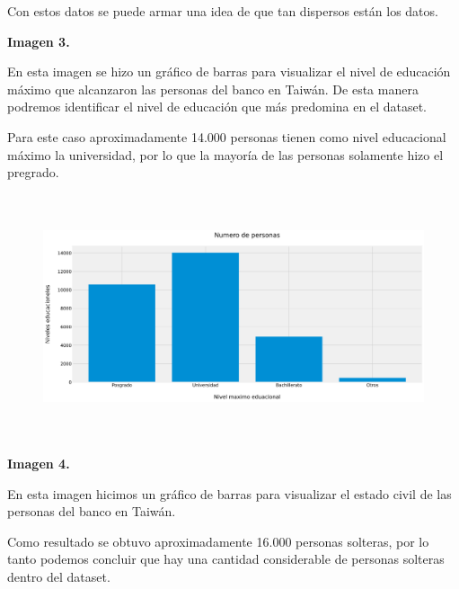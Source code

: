 \documentclass[12pt]{report}
\renewcommand{\_}{\kern-1.5pt\textunderscore\kern-1.5pt}
\begin{document}

Con estos datos se puede armar una idea de que tan dispersos están los datos.

\vspace{\baselineskip}
\begin{justify}
\textbf{Imagen 3.}
\end{justify}
\begin{justify}
En esta imagen se hizo un gráfico de barras para visualizar el nivel de educación máximo que alcanzaron las personas del banco en Taiwán. De esta manera podremos identificar el nivel de educación que más predomina en el dataset.
\end{justify}
\begin{justify}
Para este caso aproximadamente 14.000 personas tienen como nivel educacional máximo la universidad, por lo que la mayoría de las personas solamente hizo el pregrado.
\end{justify}



\begin{figure}[H]
	\begin{Center}
		\includegraphics[width=6.27in,height=2.83in]{./media/image3.png}
	\end{Center}
\end{figure}




\vspace{\baselineskip}
\vspace{\baselineskip}
\begin{justify}
\textbf{Imagen 4.}
\end{justify}
\begin{justify}
En esta imagen hicimos un gráfico de barras para visualizar el estado civil de las personas del banco en Taiwán.
\end{justify}
\begin{justify}
Como resultado se obtuvo aproximadamente 16.000 personas solteras, por lo tanto podemos concluir que hay una cantidad considerable de personas solteras dentro del dataset.
\end{justify}
\end{document}
